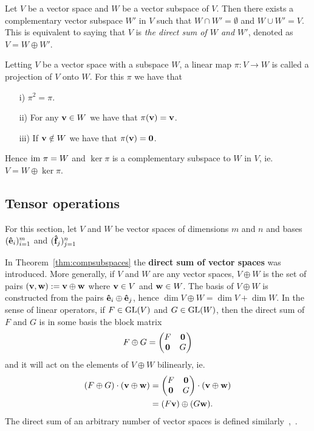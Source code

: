 	\begin{theorem}\label{thm:compsubspaces}\cite[Thm.12.16]{Holst}
		Let $V$ be a vector space and $W$ be a vector subspace of $V$. Then there exists a complementary vector subspace $W'$ in $V$ such that $W \cap W' = \emptyset$ and $W \cup W' = V$. This is equivalent to saying that $V$ is \textit{the direct sum of $W$ and $W'$}, denoted as $V = W \oplus W'$.
	\end{theorem}
	
\begin{example}
		Letting $V$ be a vector space with a subspace $W$, a linear map $\pi: V \rightarrow W$ is called a projection of $V$ onto $W$. For this $\pi$ we have that
	\begin{enumerate}
		\item[i)]  $\pi^2 = \pi$.
		\item[ii)] For any $\mathbf{v} \in W$ we have that $\pi(\mathbf{v}) = \mathbf{v}$.
		\item[iii)] If $\mathbf{v} \notin W$ we have that $\pi(\mathbf{v}) = \mathbf{0}$. 
	\end{enumerate}
	Hence $\text{im } \pi = W$ and $\ker \pi$ is a complementary subspace to $W$ in $V$, ie. $V  = W \oplus \ker \pi$.
\end{example}
		
\subsection{Tensor operations}\label{sect:tensoralgebra}

For this section, let $V$ and $W$ be vector spaces of dimensions $m$ and $n$ and bases $(\mathbf{\hat{e}}_i)_{i=1}^m$ and $(\mathbf{\hat{f}}_j)_{j=1}^n$
	
In Theorem~\ref{thm:compsubspaces} the \textbf{direct sum of vector spaces} was introduced. More generally, if $V$ and $W$ are any vector spaces, $V \oplus W$ is the set of pairs $(\mathbf{v}, \mathbf{w}) := \mathbf{v} \oplus \mathbf{w}$ where $\mathbf{v} \in V$ and $\mathbf{w} \in W$. The basis of $V \oplus W$ is constructed from the pairs $\mathbf{\hat{e}}_i \oplus \mathbf{\hat{e}}_j$, hence $\dim V \oplus W = \dim V + \dim W$. In the sense of linear operators, if $F \in \text{GL}(V)$ and $G \in \text{GL}(W)$, then the direct sum of $F$ and $G$ is in some basis the block matrix
\begin{align*}
	F \oplus G = \begin{pmatrix}
	F & \mathbf{0} \\
	\mathbf{0} & G
\end{pmatrix}
\end{align*} and it will act on the elements of $V \oplus W$ bilinearly, ie. 
	\begin{align*}
			(F \oplus G) \cdot (\mathbf{v} \oplus \mathbf{w}) &= \begin{pmatrix}
					F & \mathbf{0} \\
					\mathbf{0} & G
				\end{pmatrix} \cdot (\mathbf{v} \oplus \mathbf{w})  \\
			&= (F\mathbf{v}) \oplus (G \mathbf{w}).
		\end{align*} The direct sum of an arbitrary number of vector spaces is defined similarly~\cite[Sect.1.3.]{Serre},~\cite[Sect.1.5.]{Sagan}.
		
